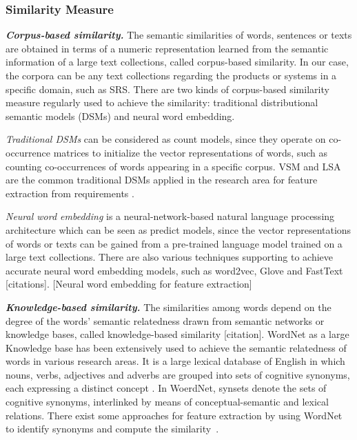 \documentclass[graybox]{svmult}
\newcommand{\todo}[1]{{\color{red} [#1]}}
\begin{document}
\subsubsection{Similarity Measure}
\textit{\textbf{Corpus-based similarity.}}
The semantic similarities of words, sentences or texts are obtained in terms of a numeric representation learned from the semantic information of a large text collections, called corpus-based similarity. In our case, the corpora can be any text collections regarding the products or systems in a specific domain, such as SRS. There are two kinds of corpus-based similarity measure regularly used to achieve the similarity: traditional distributional semantic models (DSMs) and neural word embedding.

\textit{Traditional DSMs} can be considered as count models, since they operate on co-occurrence matrices to initialize the vector representations of words, such as counting co-occurrences of words appearing in a specific corpus. VSM and LSA are the common traditional DSMs applied in the research area for feature extraction from requirements \cite{KumakiTWF12,AlvesSBRSRPR08,WestonCR09}.

\textit{Neural word embedding} is a neural-network-based natural language processing architecture which can be seen as predict models, since the vector representations of words or texts can be gained from a pre-trained language model trained on a large text collections. There are also various techniques supporting to achieve accurate neural word embedding models, such as word2vec, Glove and FastText \todo{citations}. \todo{Neural word embedding for feature extraction}

\textit{\textbf{Knowledge-based similarity.}}
The similarities among words depend on the degree of the words' semantic relatedness drawn from semantic networks or knowledge bases, called knowledge-based similarity \todo{citation}\cite{Corpus-based and Knowledge-based Measures of Text Semantic Similarity}. WordNet as a large Knowledge base has been extensively used to achieve the semantic relatedness of words in various research areas. It is a large lexical database of English in which nouns, verbs, adjectives and adverbs are grouped into sets of cognitive synonyms, each expressing a distinct concept \cite{Miller95}. In WoerdNet, synsets denote the sets of cognitive synonyms, interlinked by means of conceptual-semantic and lexical relations. There exist some approaches for feature extraction by using WordNet to identify synonyms and compute the similarity~\cite{ItzikR14,ItzikRBW16,Wang15,Wang16}.
\end{document}
